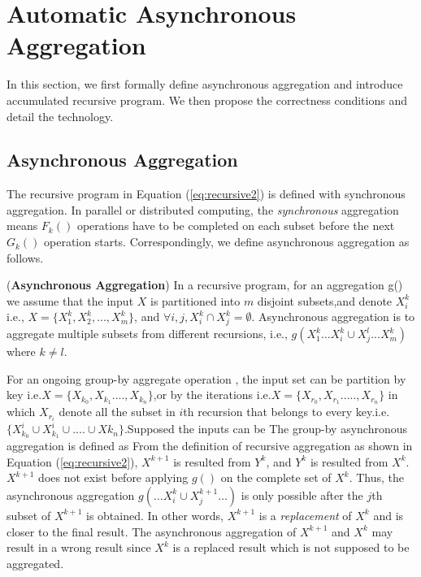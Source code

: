\section{Automatic Asynchronous Aggregation}
\label{sec:async}
In this section, we first formally define asynchronous aggregation and introduce accumulated recursive program. We then propose the correctness conditions and detail the technology.

\subsection{Asynchronous Aggregation}
\label{sec:async:async}

The recursive program in Equation (\ref{eq:recursive2}) is defined with synchronous aggregation. In parallel or distributed computing, the \emph{synchronous} aggregation means $F_k()$ operations have to be completed on each subset before the next $G_k()$ operation starts. %
Correspondingly, we define asynchronous aggregation as follows.

\begin{definition}
	\label{def:asyncaggre}
	(\textbf{Asynchronous Aggregation}) In a recursive program, for an aggregation g() we assume that the input  $X$  is partitioned into $m$ disjoint subsets,and denote $X_i^k$ i.e., $X=\{X_1^k,X_2^k,\ldots,X_m^k\}$, and $\forall i,j, X_i^k\cap X_j^k=\emptyset$. Asynchronous aggregation is to aggregate multiple subsets from different recursions, i.e., $g(X_1^k \ldots X_i^k\cup X_j^{l}...X_m^k)$ where $k\neq l$.
\end{definition}

For an ongoing group-by aggregate operation , the input set can be partition by key i.e.$X=\{X_{k_0},X_{k_1}....,X_{k_n}\}$,or by the iterations i.e.$X=\{X_{r_0},X_{r_1}.....,X_{r_n}\}$ in which $X_{r_i}$ denote all the subset in $i$th recursion that belongs to every key.i.e. $\{X_{k_0}^i\cup X_{k_1}^i\cup ....\cup X{k_n}\}$.Supposed the inputs can be The group-by asynchronous aggregation is defined as 
From the definition of recursive aggregation as shown in Equation (\ref{eq:recursive2}), $X^{k+1}$ is resulted from $Y^k$, and $Y^k$ is resulted from $X^k$. $X^{k+1}$ does not exist before applying $g()$ on the complete set of $X^k$. Thus, the asynchronous aggregation $g(\ldots X_i^k\cup X_j^{k+1} \ldots)$ is only possible after the $j$th subset of $X^{k+1}$ is obtained. In other words, $X^{k+1}$ is a \emph{replacement} of $X^k$ and is closer to the final result. The asynchronous aggregation of $X^{k+1}$ and $X^k$ may result in a wrong result since $X^k$ is a replaced result which is not supposed to be aggregated.

